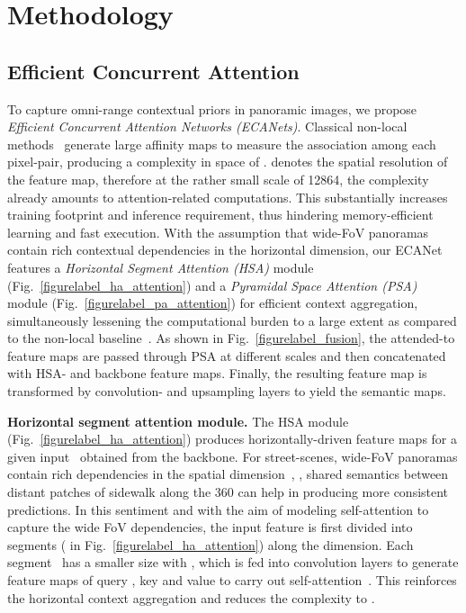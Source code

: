 \documentclass[final]{cvpr}
\begin{document}
\section{Methodology}
\subsection{Efficient Concurrent Attention}
To capture omni-range contextual priors in panoramic images, we propose \emph{Efficient Concurrent Attention Networks (ECANets)}.
Classical non-local methods~\cite{fu2019dual,wang2018non} generate large affinity maps to measure the association among each pixel-pair, producing a complexity in space of .
 denotes the spatial resolution of the feature map, therefore at the rather small scale of 12864, the complexity already amounts to  attention-related computations.
This substantially increases training footprint and inference requirement, thus hindering memory-efficient learning and fast execution.
With the assumption that wide-FoV panoramas contain rich contextual dependencies in the horizontal dimension, our ECANet features a \emph{Horizontal Segment Attention (HSA)} module (Fig.~\ref{figurelabel_ha_attention}) and a \emph{Pyramidal Space Attention (PSA)} module (Fig.~\ref{figurelabel_pa_attention}) for efficient context aggregation, simultaneously lessening the computational burden to a large extent as compared to the non-local baseline~\cite{wang2018non}.
As shown in Fig.~\ref{figurelabel_fusion}, the attended-to feature maps are passed through PSA at different scales and then concatenated with HSA- and backbone feature maps.
Finally, the resulting feature map is transformed by convolution- and upsampling layers to yield the semantic maps.

\noindent
\textbf{Horizontal segment attention module.}
The HSA module (Fig.~\ref{figurelabel_ha_attention}) produces horizontally-driven feature maps for a given input~ obtained from the backbone.
For street-scenes, wide-FoV panoramas contain rich dependencies in the spatial dimension~, 
\eg, shared semantics between distant patches of sidewalk along the 360 can help in producing more consistent predictions.
In this sentiment and with the aim of modeling self-attention to capture the wide FoV dependencies, the input feature is first divided into  segments ( in Fig.~\ref{figurelabel_ha_attention}) along the  dimension.
Each segment~ has a smaller size with , which is fed into convolution layers to generate feature maps of query , key  and value  to carry out self-attention~\cite{vaswani2017attention}.
This reinforces the horizontal context aggregation and reduces the complexity to .
\end{document}
